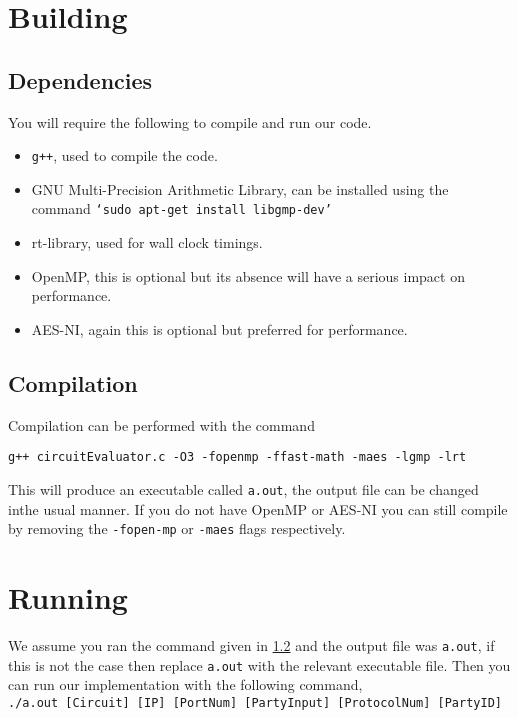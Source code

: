 \documentclass[ %
                    author={Nicholas Tutte},
                supervisor={Prof. Nigel Smart},
                    degree={MEng},
                     title={Secure Two Party Computation},
                  subtitle={A practical comparison of recent protocols},
                      type={Research - GG1K},
                      year={2015} ]{dissertation}
\begin{document}
\begin{appendices}
			\section{Building}
				\subsection{Dependencies}
					You will require the following to compile and run our code.

					\begin{itemize}
						\item \texttt{g++}, used to compile the code.
						\item GNU Multi-Precision Arithmetic Library, can be installed using the command \texttt{`sudo apt-get install libgmp-dev'}
						\item rt-library, used for wall clock timings.
						\item OpenMP, this is optional but its absence will have a serious impact on performance.
						\item AES-NI, again this is optional but preferred for performance.
					\end{itemize}

				\subsection{Compilation} \label{sub:CompilationInstructs}
					Compilation can be performed with the command
					\begin{center}
						\texttt{g++ circuitEvaluator.c -O3 -fopenmp -ffast-math -maes -lgmp -lrt}
					\end{center}

					This will produce an executable called \texttt{a.out}, the output file can be changed inthe usual manner. If you do not have OpenMP or AES-NI you can still compile by removing the \texttt{-fopen-mp} or \texttt{-maes} flags respectively.


			\section{Running}
				We assume you ran the command given in \ref{sub:CompilationInstructs} and the output file was \texttt{a.out}, if this is not the case then replace \texttt{a.out} with the relevant executable file. Then you can run our implementation with the following command,\\

				\texttt{./a.out [Circuit] [IP] [PortNum] [PartyInput] [ProtocolNum] [PartyID]}


\end{appendices}
\end{document}
